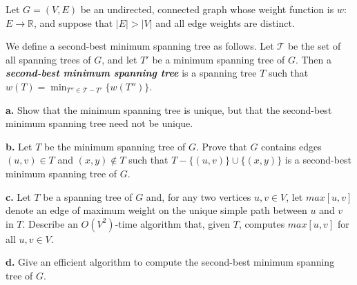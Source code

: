 Let $G = (V,E)$ be an undirected, connected graph whose weight function is $w$: 
$E \rightarrow \mathbb{R}$, and suppose that $|E| > |V|$ and all edge weights are 
distinct.

We define a second-best minimum spanning tree as follows. Let $\mathcal{T}$ be the 
set of all spanning trees of $G$, and let $T'$ be a minimum spanning tree of $G$. 
Then a \textit{\textbf{second-best minimum spanning tree}} is a spanning tree $T$ such 
that $w(T) = \min_{T'' \in \mathcal{T}-{T'}}\{w(T'')\}$.

\textbf{a.} Show that the minimum spanning tree is unique, but that the second-best 
minimum spanning tree need not be unique.

\textbf{b.} Let $T$ be the minimum spanning tree of $G$. Prove that $G$ contains edges
$(u,v) \in T$ and $(x,y) \notin T$ such that $T-\{(u,v)\}\cup\{(x,y)\}$ is a second-best 
minimum spanning tree of $G$.

\textbf{c.} Let $T$ be a spanning tree of $G$ and, for any two vertices $u,v \in V$, 
let $max[u,v]$ denote an edge of maximum weight on the unique simple path between 
$u$ and $v$ in $T$. Describe an $O(V^2)$-time algorithm that, given $T$, computes 
$max[u,v]$ for all $u,v \in V$.

\textbf{d.} Give an efficient algorithm to compute the second-best minimum spanning 
tree of $G$.
